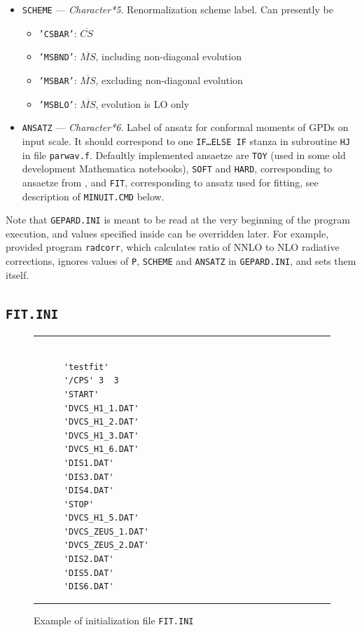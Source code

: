 \documentclass[12pt]{article}
\begin{document}
\begin{itemize}
\item
\texttt{SCHEME} --- \emph{Character*5}. Renormalization scheme label. 
Can presently be 
\begin{itemize}
\item \texttt{'CSBAR'}: $\overline{CS}$
\item \texttt{'MSBND'}: $\overline{MS}$, including non-diagonal evolution
\item \texttt{'MSBAR'}: $\overline{MS}$, excluding non-diagonal evolution
\item \texttt{'MSBLO'}: $\overline{MS}$, evolution is LO only
\end{itemize}

\item
\texttt{ANSATZ} --- \emph{Character*6}. Label of ansatz for conformal moments of GPDs on input scale. 
It should correspond to one  \texttt{IF\ldots ELSE IF} stanza in subroutine
\texttt{HJ} in file \texttt{parwav.f}. Defaultly implemented ansaetze are
\texttt{TOY} (used in some old development Mathematica notebooks), \texttt{SOFT} and \texttt{HARD},
corresponding to ansaetze from \cite{Kumericki:2006xx}, and \texttt{FIT}, corresponding
to ansatz used for fitting, see description of \texttt{MINUIT.CMD} below.

\end{itemize}

Note that \texttt{GEPARD.INI} is meant to be read at the very beginning of the
program execution, and values specified inside can be overridden later. For
example, provided program \texttt{radcorr}, which calculates ratio of NNLO to NLO
radiative corrections, ignores values of \texttt{P}, \texttt{SCHEME} and
\texttt{ANSATZ} in \texttt{GEPARD.INI}, and sets them itself.


\subsection{\texttt{FIT.INI}}

\begin{figure}[t]
\begin{center}
\hrule
\begin{verbatim}

      'testfit'
      '/CPS' 3  3
      'START'
      'DVCS_H1_1.DAT'
      'DVCS_H1_2.DAT'
      'DVCS_H1_3.DAT'
      'DVCS_H1_6.DAT'
      'DIS1.DAT'
      'DIS3.DAT'
      'DIS4.DAT'
      'STOP'
      'DVCS_H1_5.DAT'
      'DVCS_ZEUS_1.DAT'
      'DVCS_ZEUS_2.DAT'
      'DIS2.DAT'
      'DIS5.DAT'
      'DIS6.DAT'

\end{verbatim}
\hrule
\end{center}
\caption{Example of initialization file \texttt{FIT.INI}}
\label{fig:FIT.INI}
\end{figure}
\end{document}
